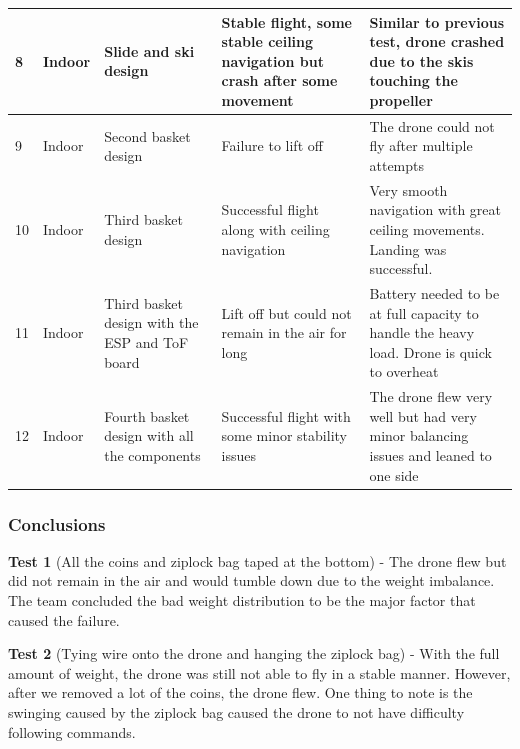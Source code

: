 \documentclass[12pt]{article}
\begin{document}
\begin{longtable}{ | m{1.5cm} | m{2cm}| m{3cm} | m{4cm} | m{4cm} |}
                8 & Indoor &
                Slide and ski design &
                Stable flight, some stable ceiling navigation but crash after some movement &
                Similar to previous test, drone crashed due to the skis touching the propeller \\\hline

                9 & Indoor &
                Second basket design &
                Failure to lift off &
                The drone could not fly after multiple attempts \\\hline

                10 & Indoor &
                Third basket design &
                Successful flight along with ceiling navigation &
                Very smooth navigation with great ceiling movements. Landing was successful. \\\hline

                11 & Indoor &
                Third basket design with the ESP and ToF board &
                Lift off but could not remain in the air for long &
                Battery needed to be at full capacity to handle the heavy load. Drone is quick to overheat \\\hline

                12 & Indoor &
                Fourth basket design with all the components &
                Successful flight with some minor stability issues &
                The drone flew very well but had very minor balancing issues and leaned to one side \\\hline

            \end{longtable}

            \subsubsection*{Conclusions}
                \newcommand{\teststatement}[3]{
                    \vspace{0.5cm}\noindent\textbf{#1} (#2) - #3
                }

                \teststatement{Test 1} {All the coins and ziplock bag taped at the bottom} {
                    The drone flew but did not remain in the air and would tumble down due to the weight imbalance.
                    The team concluded the bad weight distribution to be the major factor that caused the failure.
                }

                \teststatement{Test 2} {Tying wire onto the drone and hanging the ziplock bag} {
                    With the full amount of weight, the drone was still not able to fly in a stable manner.
                    However, after we removed a lot of the coins, the drone flew.
                    One thing to note is the swinging caused by the ziplock bag caused the drone to not have difficulty following commands.
                }
\end{document}
